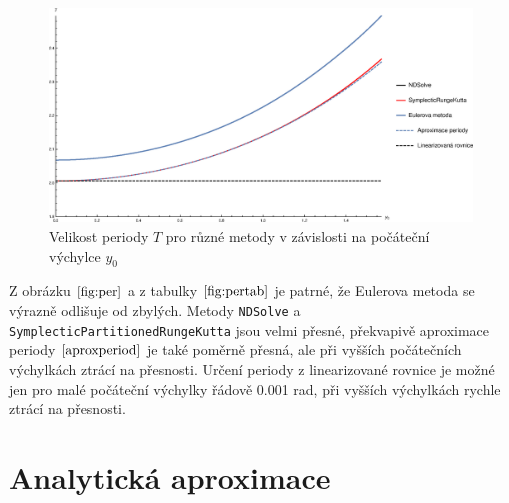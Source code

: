 {\begin{figure}[h]
  \centering
  \includegraphics[width=17cm]{figures/PER2+LIN.eps}
  \caption{Velikost periody $T$ pro různé metody v závislosti na počáteční výchylce $y_{0}$}
  \label{fig:per}
\end{figure}

Z obrázku $\eqref{fig:per}$ a z tabulky $\eqref{fig:pertab}$ je patrné, že Eulerova metoda se výrazně odlišuje od zbylých. Metody \texttt{NDSolve} a \texttt{SymplecticPartitionedRungeKutta} jsou velmi přesné, překvapivě aproximace periody $\eqref{aproxperiod}$ je také poměrně přesná, ale při vyšších počátečních výchylkách ztrácí na přesnosti. Určení periody z linearizované rovnice je možné jen pro malé počáteční výchylky řádově 0.001 \si{rad}, při vyšších výchylkách rychle ztrácí na přesnosti.

\section{Analytická aproximace}
\label{sec:Analytická aproximace}

}
